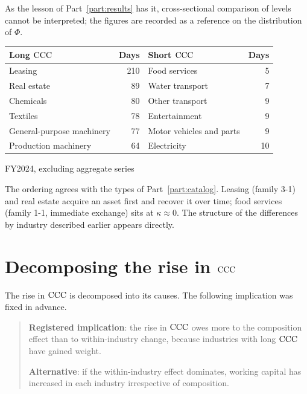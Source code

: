 As the lesson of Part~\ref{part:results} has it, cross-sectional comparison of levels cannot
be interpreted; the figures are recorded as a reference on the distribution of $\Phi$.

\begin{center}
\begin{tabular}{@{}lrlr@{}}
\toprule
Long $\mathrm{CCC}$ & Days & Short $\mathrm{CCC}$ & Days \\
\midrule
Leasing & 210 & Food services & 5 \\
Real estate & 89 & Water transport & 7 \\
Chemicals & 80 & Other transport & 9 \\
Textiles & 78 & Entertainment & 9 \\
General-purpose machinery & 77 & Motor vehicles and parts & 9 \\
Production machinery & 64 & Electricity & 10 \\
\bottomrule
\end{tabular}
\label{tab:ccc-extremes-by-industry}
\end{center}
\begin{center}\footnotesize FY2024, excluding aggregate series\end{center}

The ordering agrees with the types of Part~\ref{part:catalog}. Leasing (family 3-1) and real
estate acquire an asset first and recover it over time; food services (family 1-1, immediate
exchange) sits at $\kappa\approx 0$. The structure of the differences by industry described
earlier appears directly.

\section{Decomposing the rise in \texorpdfstring{$\mathrm{CCC}$}{CCC}}
\label{sec:ccc-decomposition}

The rise in $\mathrm{CCC}$ is decomposed into its causes. The following implication was fixed in
advance.

\begin{quote}
\textbf{Registered implication}: the rise in $\mathrm{CCC}$ owes more to the composition effect than
to within-industry change, because industries with long $\mathrm{CCC}$ have gained weight.

\textbf{Alternative}: if the within-industry effect dominates, working capital has increased
in each industry irrespective of composition.
\end{quote}

